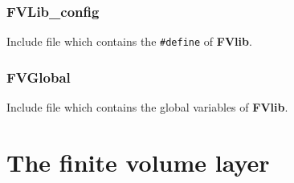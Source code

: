 \documentclass[12pt]{book}
\newcommand{\FVlib}{{\bf FVlib}}
\begin{document}
\section{FVLib\_config}\label{FVLib_config}   
Include file which contains  the {\tt \#define} of \FVlib.

\section{FVGlobal}\label{FVGlobal}
Include file which contains  the global variables of \FVlib.

\part{The finite volume layer} 
\end{document}
